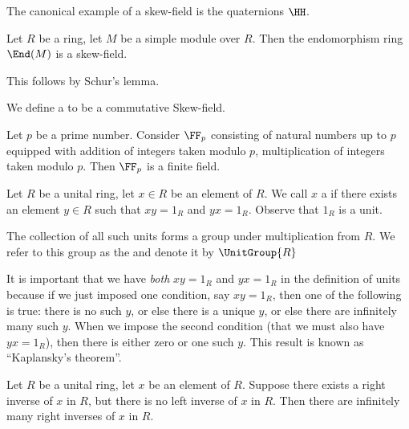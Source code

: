\begin{example}
The canonical example of a skew-field is the quaternions $\HH$.
\end{example}

\begin{theorem}
Let $R$ be a ring, let $M$ be a simple module over $R$. Then the endomorphism ring $\End(M)$ is a
skew-field.
\end{theorem}

This follows by Schur's lemma.

\begin{definition}[Field]
We define a  to be a commutative Skew-field.
\end{definition}

\begin{example}
Let $p$ be a prime number. Consider $\FF_{p}$ consisting of natural
numbers up to $p$ equipped with addition of integers taken modulo $p$,
multiplication of integers taken modulo $p$. Then $\FF_{p}$ is a
finite field.
\end{example}

\begin{definition}
Let $R$ be a unital ring, let $x\in R$ be an element of $R$.
We call $x$ a  if there exists an element $y\in R$
such that $xy=1_{R}$ and $yx=1_{R}$. Observe that $1_{R}$ is a unit.

The collection of all such units forms a group under multiplication
from $R$. We refer to this group as the  and
denote it by $\UnitGroup{R}$
\end{definition}

\begin{remark}
It is important that we have \emph{both} $xy=1_{R}$ and $yx=1_{R}$ in
the definition of units because if we just imposed one condition, say
$xy=1_{R}$, then one of the following is true: there is no such $y$,
or else there is a unique $y$, or else there are infinitely many such $y$.
When we impose the second condition (that we must also have $yx=1_{R}$),
then there is either zero or one such $y$. This result is known as
``Kaplansky's theorem''.
\end{remark}

\begin{theorem}
Let $R$ be a unital ring, let $x$ be an element of $R$.
Suppose there exists a right inverse of $x$ in $R$, but there is no
left inverse of $x$ in $R$. Then there are infinitely many right
inverses of $x$ in $R$.
\end{theorem}


